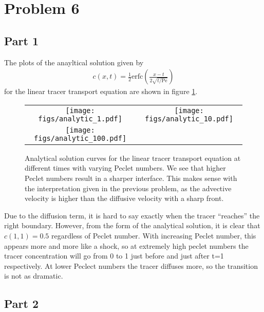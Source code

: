 \documentclass{article}
\begin{document}
\section{Problem 6}
\subsection{Part 1}
The plots of the anayltical solution given by
\begin{align}
    c(x,t) = \frac{1}{2} \mathrm{erfc} \left( \frac{x - t}{2 \sqrt{t / \mathrm{Pe}}} \right)
\end{align}
for the linear tracer transport equation are shown in figure \ref{fig:pe-analytical}.
\begin{figure}
\centering
\begin{tabular}{c c}
    \texttt{[image: figs/analytic\_1.pdf]} &
    \texttt{[image: figs/analytic\_10.pdf]} \\
    \texttt{[image: figs/analytic\_100.pdf]} &
    \\
\end{tabular}
\caption{Analytical solution curves for the linear tracer transport equation at different times with varying Peclet numbers. We see that higher Peclet numbers result in a sharper interface. This makes sense with the interpretation given in the previous problem, as the advective velocity is higher than the diffusive velocity with a sharp front.}
\label{fig:pe-analytical}
\end{figure}

Due to the diffusion term, it is hard to say exactly when the tracer ``reaches'' the right boundary.
However, from the form of the analytical solution, it is clear that $c(1,1) = 0.5$ regardless of Peclet number.
With increasing Peclet number, this appears more and more like a shock, so at extremely high peclet numbers the tracer concentration will go from 0 to 1 just before and just after t=1 respectively.
At lower Peclect numbers the tracer diffuses more, so the transition is not as dramatic.

\subsection{Part 2}

% 
\end{document}
